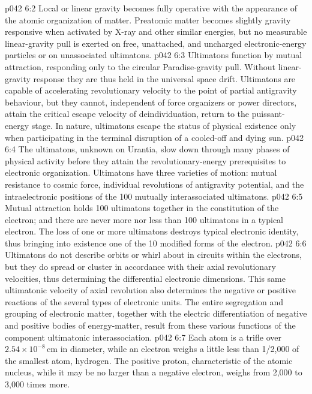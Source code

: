 \vs p042 6:2 Local or linear gravity becomes fully operative with the appearance of the atomic organization of matter. Preatomic matter becomes slightly gravity responsive when activated by X\hyp{}ray and other similar energies, but no measurable linear\hyp{}gravity pull is exerted on free, unattached, and uncharged electronic\hyp{}energy particles or on unassociated ultimatons.
\vs p042 6:3 \pc Ultimatons function by mutual attraction, responding only to the circular Paradise\hyp{}gravity pull. Without linear\hyp{}gravity response they are thus held in the universal space drift. Ultimatons are capable of accelerating revolutionary velocity to the point of partial antigravity behaviour, but they cannot, independent of force organizers or power directors, attain the critical escape velocity of deindividuation, return to the puissant\hyp{}energy stage. In nature, ultimatons escape the status of physical existence only when participating in the terminal disruption of a cooled\hyp{}off and dying sun.
\vs p042 6:4 \pc The ultimatons, unknown on Urantia, slow down through many phases of physical activity before they attain the revolutionary\hyp{}energy prerequisites to electronic organization. Ultimatons have three varieties of motion: mutual resistance to cosmic force, individual revolutions of antigravity potential, and the intraelectronic positions of the 100 mutually interassociated ultimatons.
\vs p042 6:5 Mutual attraction holds 100 ultimatons together in the constitution of the electron; and there are never more nor less than 100 ultimatons in a typical electron. The loss of one or more ultimatons destroys typical electronic identity, thus bringing into existence one of the 10 modified forms of the electron.
\vs p042 6:6 Ultimatons do not describe orbits or whirl about in circuits within the electrons, but they do spread or cluster in accordance with their axial revolutionary velocities, thus determining the differential electronic dimensions. This same ultimatonic velocity of axial revolution also determines the negative or positive reactions of the several types of electronic units. The entire segregation and grouping of electronic matter, together with the electric differentiation of negative and positive bodies of energy\hyp{}matter, result from these various functions of the component ultimatonic interassociation.
\vs p042 6:7 \pc Each atom is a trifle over $2.54 \times 10^{-8}$\,cm in diameter, while an electron weighs a little less than 1/2,000 of the smallest atom, hydrogen. The positive proton, characteristic of the atomic nucleus, while it may be no larger than a negative electron, weighs from 2,000 to 3,000 times more.
